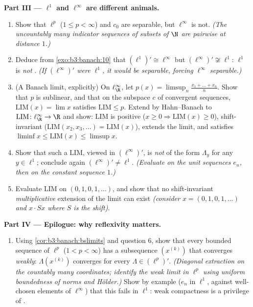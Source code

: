 \begin{problem}[{Weekend problem --- $(\ell^p)' = \ell^q$,
reflexivity, and the strangeness of $\ell^\infty$}]
\medskip
\noindent\textbf{Part III --- $\ell^1$ and $\ell^\infty$ are
different animals.}
\begin{enumerate}[resume]
  \item Show that $\ell^p$ ($1 \leq p < \infty$) and $c_0$ are
        separable, but $\ell^\infty$ is not. \emph{(The
        uncountably many indicator sequences of subsets of $\N$
        are pairwise at distance $1$.)}
  \item Deduce from \cref{exo:b3:banach:10} that $(\ell^1)'
        \cong \ell^\infty$ but $(\ell^\infty)' \not\cong
        \ell^1$: $\ell^1$ is \emph{not} .
        \emph{(If $(\ell^\infty)'$ were $\ell^1$, it would be
        separable, forcing $\ell^\infty$ separable.)}
  \item (A Banach limit, explicitly) On $\ell^\infty_\R$, let
        $p(x) = \limsup_n \frac{x_1 + \dots + x_n}{n}$. Show
        that $p$ is sublinear, and that on the subspace $c$ of
        convergent sequences, $\mathrm{LIM}(x) = \lim x$
        satisfies $\mathrm{LIM} \leq p$. Extend by Hahn--Banach
        to $\mathrm{LIM} \colon \ell^\infty_\R \to \R$ and show:
        $\mathrm{LIM}$ is positive ($x \geq 0 \Rightarrow
        \mathrm{LIM}(x) \geq 0$), shift-invariant
        ($\mathrm{LIM}(x_2, x_3, \dots) = \mathrm{LIM}(x)$),
        extends the limit, and satisfies $\liminf x \leq
        \mathrm{LIM}(x)\leq \limsup x$.
  \item Show that such a $\mathrm{LIM}$, viewed in
        $(\ell^\infty)'$, is \emph{not} of the form $\Lambda_y$
        for any $y \in \ell^1$; conclude again $(\ell^\infty)'
        \neq \ell^1$. \emph{(Evaluate on the unit sequences
        $e_n$, then on the constant sequence $1$.)}
  \item Evaluate $\mathrm{LIM}$ on $(0,1,0,1,\dots)$, and show
        that no shift-invariant \emph{multiplicative} extension
        of the limit can exist \emph{(consider $x =
        (0,1,0,1,\dots)$ and $x\cdot Sx$ where $S$ is the
        shift)}.
\end{enumerate}

\medskip
\noindent\textbf{Part IV --- Epilogue: why reflexivity
matters.}
\begin{enumerate}[resume]
  \item Using \cref{cor:b3:banach:bslimits} and question 6,
        show that every bounded sequence of $\ell^p$ ($1 < p <
        \infty$) has a subsequence $(x^{(k)})$ that converges
        \emph{weakly}: $\Lambda(x^{(k)})$ converges for every
        $\Lambda \in (\ell^p)'$. \emph{(Diagonal extraction on
        the countably many coordinates; identify the weak limit
        in $\ell^p$ using uniform boundedness of norms and
        H\"older.)} Show by example ($e_n$ in $\ell^1$, against
        well-chosen elements of $\ell^\infty$) that this fails
        in $\ell^1$: weak compactness is a privilege of
        .
\end{enumerate}


\end{problem}
